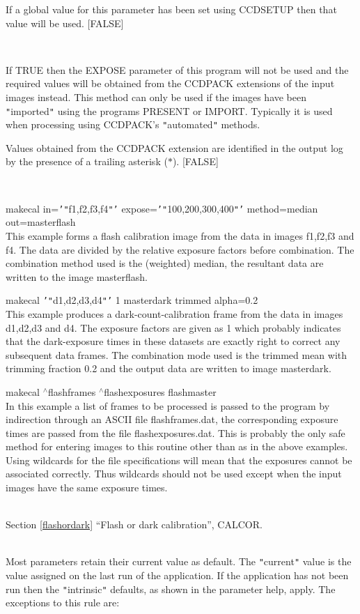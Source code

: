 \documentclass[twoside,11pt]{article}
\newcommand{\htmlref}[2]{#1}
\newcommand{\latexhtml}[2]{#1}
\renewcommand{\_}{\texttt{\symbol{95}}}
\newcommand{\qt}[1]{{\tt "}#1{\tt "}}
\newcommand{\qs}[1]{{\tt '}#1{\tt '}}
\newcommand{\xroutine}[1]{\htmlref{{\sc #1}}{#1}}
\newcommand{\secref}[2]{\latexhtml{Section \ref{#1} ``#2''}{``\htmlref{#2}{#1}''}}
\newcommand{\sstexamples}[1]{
   \item[Examples:] \mbox{} \\
   \vspace{-3.5ex}
   \begin{description}
      #1
   \end{description}
}
\newcommand{\sstsubsection}[1]{ \item[{#1}] \mbox{} \\}
\newcommand{\sstexamplesubsection}[2]{\sloppy \item{\ssttt #1} \mbox{} \\ #2 }
\newcommand{\sstdiytopic}[2]{\item[#1:] \mbox{} \\[1.3ex] #2}
\newcommand{\sstitemlist}[1]{
  \mbox{} \\
  \vspace{-3.5ex}
  \begin{itemize}
     #1
  \end{itemize}
}
\newcommand{\sstexamples}[1]{
      \item[Examples:] \\
      \begin{description}
         #1
      \end{description}
      \\
   }
\newcommand{\sstsubsection}[1]{\item[{#1}]}
\newcommand{\sstexamplesubsection}[2]{\item[{\ssttt #1}] #2}
\newcommand{\sstdiytopic}[2]{\item[{#1:}] #2 }
\newcommand{\sstitemlist}[1]{
      \begin{itemize}
         #1
      \end{itemize}
      \\
   }
\begin{document}
{{{         If a global value for this parameter has been set using 
         \xroutine{CCDSETUP} then that value will be used.
         [FALSE]
      }
      \sstsubsection{
         USEEXT = \_LOGICAL (Read)
      } {
         If TRUE then the EXPOSE parameter of this program will not
         be used and the required values will be obtained from the
         CCDPACK extensions of the input images instead. This method can
         only be used if the images have been \qt{imported} using the
         programs \xroutine{PRESENT} or \xroutine{IMPORT}. Typically it is used when
         processing using CCDPACK's \qt{automated} methods.

         Values obtained from the CCDPACK extension are identified in
         the output log by the presence of a trailing asterisk ($*$).
         [FALSE]
      }
   }
   \sstexamples{
      \sstexamplesubsection{
         makecal in=\qs{\qt{f1,f2,f3,f4}} expose=\qs{\qt{100,200,300,400}}
                 method=median out=master\_flash
      } {
         This example forms a flash calibration image from the data in
         images f1,f2,f3 and f4. The data are divided by the relative
         exposure factors before combination. The combination method
         used is the (weighted) median, the resultant data are written
         to the image master\_flash.
      }
      \sstexamplesubsection{
         makecal \qs{\qt{d1,d2,d3,d4}} 1 master\_dark trimmed alpha=0.2
      } {
         This example produces a dark-count-calibration frame from the
         data in images d1,d2,d3 and d4. The exposure factors are given
         as 1 which probably indicates that the dark-exposure times in
         these datasets are exactly right to correct any subsequent
         data frames. The combination mode used is the trimmed mean with
         trimming fraction 0.2 and the output data are written to image
         master\_dark.
      }
      \sstexamplesubsection{
         makecal $^\wedge$flash\_frames $^\wedge$flash\_exposures flash\_master
      } {
         In this example a list of frames to be processed is passed to
         the program by indirection through an ASCII file
         flash\_frames.dat, the corresponding exposure times are passed
         from the file flash\_exposures.dat. This is probably the only
         safe method for entering images to this routine other than as in
         the above examples. Using wildcards for the file
         specifications will mean that the exposures cannot be
         associated correctly. Thus wildcards should not be used except
         when the input images have the same exposure times.
      }
   }
   \sstdiytopic{
      See also
   } {
      \secref{flashordark}{Flash or dark calibration},
      \xroutine{CALCOR}.
   }
   \sstdiytopic{
      Behaviour of parameters
   } {
      Most parameters retain their current value as default. The
      \qt{current} value is the value assigned on the last run of the
      application. If the application has not been run then the
      \qt{intrinsic} defaults, as shown in the parameter help, apply.
      The exceptions to this rule are:
      \sstitemlist{

}}}
\end{document}
